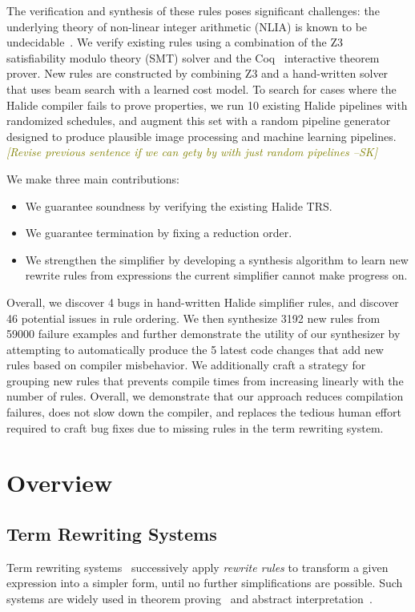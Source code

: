 \documentclass[sigplan,10pt,review,anonymous]{acmart}\settopmatter{printfolios=true,printccs=false,printacmref=false}
\newcommand{\sak}[1]{\textcolor{olive}{\textit{[{#1} --SK]}}}
\newcommand{\NumApps}{{\color{red} 10}\xspace}
\newcommand{\NumRulesFixed}{{\color{red} 4}\xspace}
\newcommand{\NumOrderingProblems}{{\color{red} 46}\xspace}
\newcommand{\NumRulesSynthesized}{{\color{red} 3192}\xspace}
\newcommand{\NumFailureExamples}{{\color{red} 59000}\xspace}
\newcommand{\NumBugsAutomated}{{\color{red} 5}\xspace}
\begin{document}
The verification and synthesis
of these rules poses significant challenges: the underlying theory of non-linear integer arithmetic (NLIA)
is known to be undecidable~\cite{matiyasevich1993hilberts10th}. We verify
existing rules using a combination of the Z3~\cite{de2008z3} satisfiability
modulo theory (SMT) solver and the Coq~\cite{coq19} interactive theorem prover. 
New rules are constructed by combining Z3 and a hand-written solver that uses beam
search with a learned cost model. To search for cases where the Halide compiler
fails to prove properties, we run \NumApps existing Halide pipelines with
randomized schedules, and augment this set with a random pipeline generator
designed to produce plausible image processing and machine learning pipelines.
\sak{Revise previous sentence if we can gety by with just random pipelines}

We make three main contributions:
\begin{itemize}
  \item We guarantee soundness by verifying the existing Halide TRS.
  \item We guarantee termination by fixing a reduction order.
  \item We strengthen the simplifier by developing a synthesis algorithm to learn new rewrite rules from expressions the current simplifier cannot make progress on.
\end{itemize}

Overall, we discover \NumRulesFixed bugs in hand-written Halide simplifier rules, and discover \NumOrderingProblems
potential issues in rule ordering.  We then synthesize \NumRulesSynthesized new rules from \NumFailureExamples
failure examples and further demonstrate the utility of our synthesizer by attempting to
automatically produce the \NumBugsAutomated latest code changes that add new
rules based on compiler misbehavior. We additionally craft a strategy for grouping
new rules that prevents compile times from increasing linearly with the number
of rules.  Overall, we demonstrate that our approach
reduces compilation failures, does not slow down the compiler, and replaces the
tedious human effort required to craft bug fixes due to missing rules in the
term rewriting system.

\section{Overview}
\subsection{Term Rewriting Systems}
Term rewriting systems~\cite{gorn1967} successively apply \textit{rewrite rules} to transform a given
expression into a simpler form, until no further simplifications are possible.  Such systems are widely
used in theorem proving~\cite{} and abstract interpretation~\cite{}.
\end{document}
